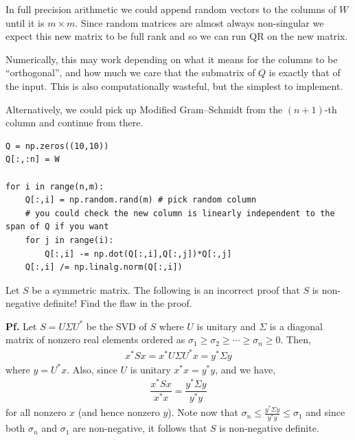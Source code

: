 \documentclass[10pt]{article}
\begin{document}
\begin{solution}[Solution]
In full precision arithmetic we could append random vectors to the columns of \( W \) until it is \( m\times m \). Since random matrices are almost always non-singular we expect this new matrix to be full rank and so we can run QR on the new matrix.

Numerically, this may work depending on what it means for the columns to be ``orthogonal'', and how much we care that the submatrix of \( Q \) is exactly that of the input. This is also computationally wasteful, but the simplest to implement.

Alternatively, we could pick up Modified Gram--Schmidt from the \( (n+1) \)-th column and continue from there.

\begin{lstlisting}
Q = np.zeros((10,10))
Q[:,:n] = W

for i in range(n,m):
    Q[:,i] = np.random.rand(m) # pick random column
    # you could check the new column is linearly independent to the span of Q if you want
    for j in range(i):
        Q[:,i] -= np.dot(Q[:,i],Q[:,j])*Q[:,j]
    Q[:,i] /= np.linalg.norm(Q[:,i])
\end{lstlisting}

\end{solution}



\begin{problem}
Let \( S \) be a symmetric matrix. The following is an incorrect proof that \( S \) is non-negative definite! Find the flaw in the proof.

\textbf{Pf.}
Let \( S = U\Sigma U^* \) be the SVD of \( S \) where \( U \) is unitary and \( \Sigma \) is a diagonal matrix of nonzero real elements ordered as \( \sigma_1 \geq \sigma_2 \geq \cdots \geq \sigma_n\geq 0 \). Then,
\begin{align*}
    x^*Sx = x^*U\Sigma U^*x = y^*\Sigma y
\end{align*}
where \( y = U^*x \). Also, since \( U \) is unitary \( x^*x = y^*y \), and we have,
\begin{align*}
    \dfrac{x^*Sx}{x^*x} = \dfrac{y^*\Sigma y}{y^*y}
\end{align*}
for all nonzero \( x \) (and hence nonzero \( y \)). Note now that \( \sigma_n \leq \frac{y^*\Sigma y}{y^*y}\leq \sigma_1 \) and since both
\( \sigma_n \) and \( \sigma_1 \) are non-negative, it follows that \( S \) is non-negative definite.
\end{problem}
\end{document}
